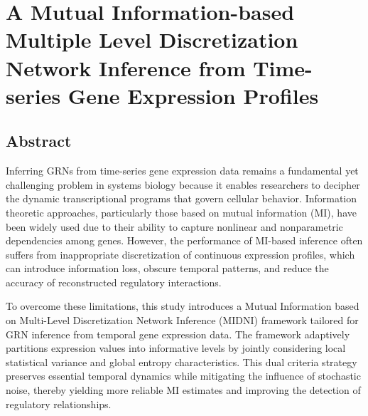 
\chapter{A Mutual Information-based Multiple Level Discretization Network Inference from Time-series Gene Expression Profiles} %

\label{Chapter2} %




\section{Abstract}
Inferring GRNs from time-series gene expression data remains a fundamental yet challenging problem in systems biology because it enables researchers to decipher the dynamic transcriptional programs that govern cellular behavior. Information theoretic approaches, particularly those based on mutual information (MI), have been widely used due to their ability to capture nonlinear and nonparametric dependencies among genes. However, the performance of MI-based inference often suffers from inappropriate discretization of continuous expression profiles, which can introduce information loss, obscure temporal patterns, and reduce the accuracy of reconstructed regulatory interactions.

To overcome these limitations, this study introduces a Mutual Information based on Multi-Level Discretization Network Inference (MIDNI) framework tailored for GRN inference from temporal gene expression data. The framework adaptively partitions expression values into informative levels by jointly considering local statistical variance and global entropy characteristics. This dual criteria strategy preserves essential temporal dynamics while mitigating the influence of stochastic noise, thereby yielding more reliable MI estimates and improving the detection of regulatory relationships.

